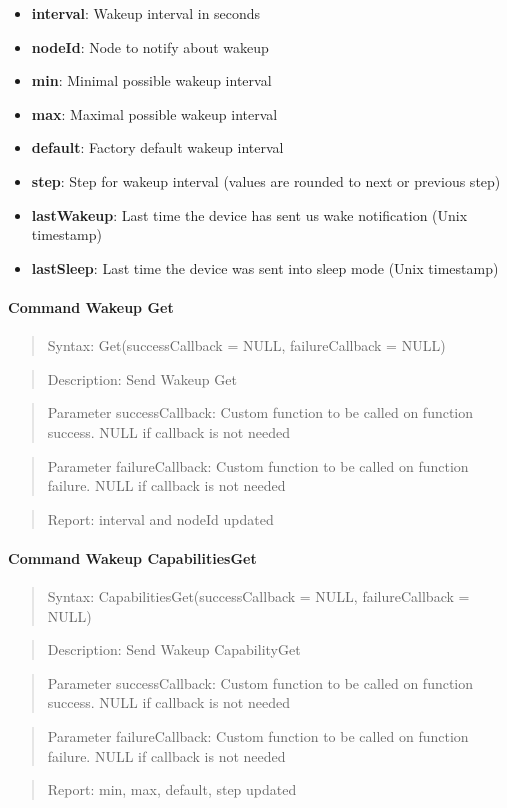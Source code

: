 \begin{itemize}
\item \textbf{interval}: Wakeup interval in seconds
\item \textbf{nodeId}: Node to notify about wakeup
\item \textbf{min}: Minimal possible wakeup interval
\item \textbf{max}: Maximal possible wakeup interval
\item \textbf{default}: Factory default wakeup interval
\item \textbf{step}: Step for wakeup interval (values are rounded to next or previous step)
\item \textbf{lastWakeup}: Last time the device has sent us wake notification (Unix timestamp)
\item \textbf{lastSleep}: Last time the device was sent into sleep mode (Unix timestamp)
\end{itemize}

\paragraph{Command Wakeup Get}
\begin{quote}Syntax: Get(successCallback = NULL, failureCallback = NULL)\end{quote}
\begin{quote}Description: Send Wakeup Get\end{quote}
\begin{quote}Parameter successCallback: Custom function to be called on function success. NULL if callback is not needed\end{quote}
\begin{quote}Parameter failureCallback: Custom function to be called on function failure. NULL if callback is not needed\end{quote}
\begin{quote}Report: interval and nodeId updated\end{quote}

\paragraph{Command Wakeup CapabilitiesGet}
\begin{quote}Syntax: CapabilitiesGet(successCallback = NULL, failureCallback = NULL)\end{quote}
\begin{quote}Description: Send Wakeup CapabilityGet\end{quote}
\begin{quote}Parameter successCallback: Custom function to be called on function success. NULL if callback is not needed\end{quote}
\begin{quote}Parameter failureCallback: Custom function to be called on function failure. NULL if callback is not needed\end{quote}
\begin{quote}Report: min, max, default, step updated\end{quote}

